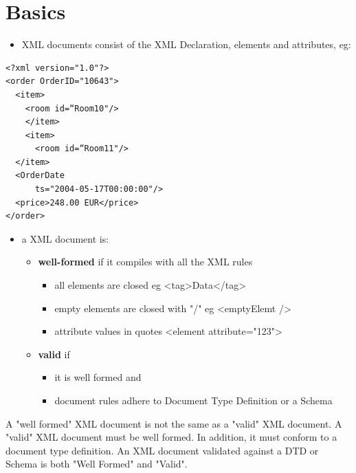 \documentclass[11pt]{article}
\begin{document}
\section{Basics}
\label{sec:org2ae71bb}
\begin{itemize}
\item XML documents consist of the XML Declaration, elements and attributes, eg:
\end{itemize}
\lstset{breaklines=true,language=XML,label= ,caption= ,captionpos=b,numbers=none}
\begin{lstlisting}
<?xml version="1.0"?>
<order OrderID="10643">
  <item>
    <room id=“Room10"/>
    </item>
    <item>
      <room id=“Room11"/>
  </item>
  <OrderDate
      ts="2004-05-17T00:00:00"/>
  <price>248.00 EUR</price>
</order>
\end{lstlisting}
\begin{itemize}
\item a XML document is:
\begin{itemize}
\item \textbf{well-formed} if it compiles with all the XML rules
\begin{itemize}
\item all elements are closed eg <tag>Data</tag>
\item empty elements are closed with "/" eg <emptyElemt />
\item attribute values in quotes <element attribute="123">
\end{itemize}
\item \textbf{valid} if
\begin{itemize}
\item it is well formed and
\item document rules adhere to Document Type Definition or a Schema
\end{itemize}
\end{itemize}
\end{itemize}
A "well formed" XML document is not the same as a "valid" XML document.
A "valid" XML document must be well formed. In addition, it must conform to a document type definition. An XML document validated against a DTD or Schema is both "Well Formed" and "Valid".
\end{document}
